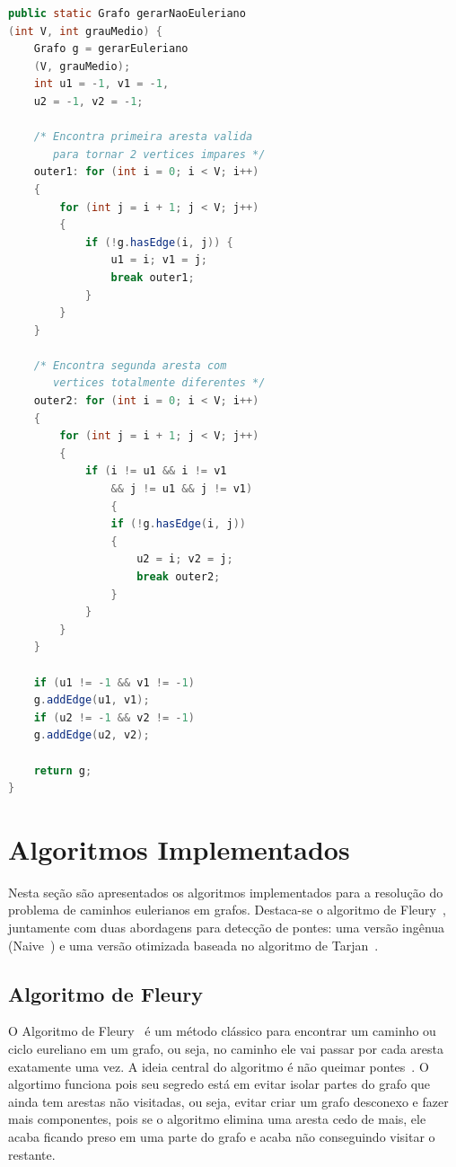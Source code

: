 \documentclass{sbc2023}%
\begin{document}
\begin{lstlisting}[language=Java, caption={Gerador de Grafo Não-Euleriano}]
public static Grafo gerarNaoEuleriano
(int V, int grauMedio) {
    Grafo g = gerarEuleriano
    (V, grauMedio);
    int u1 = -1, v1 = -1, 
    u2 = -1, v2 = -1;

    /* Encontra primeira aresta valida 
       para tornar 2 vertices impares */
    outer1: for (int i = 0; i < V; i++) 
    {
        for (int j = i + 1; j < V; j++) 
        {
            if (!g.hasEdge(i, j)) {
                u1 = i; v1 = j;
                break outer1;
            }
        }
    }

    /* Encontra segunda aresta com 
       vertices totalmente diferentes */
    outer2: for (int i = 0; i < V; i++) 
    {
        for (int j = i + 1; j < V; j++) 
        {
            if (i != u1 && i != v1 
                && j != u1 && j != v1) 
                {
                if (!g.hasEdge(i, j)) 
                {
                    u2 = i; v2 = j;
                    break outer2;
                }
            }
        }
    }

    if (u1 != -1 && v1 != -1) 
    g.addEdge(u1, v1);
    if (u2 != -1 && v2 != -1) 
    g.addEdge(u2, v2);

    return g;
}
\end{lstlisting}


\section{Algoritmos Implementados}

Nesta seção são apresentados os algoritmos implementados para a resolução do problema de caminhos eulerianos em grafos. Destaca-se o algoritmo de Fleury~\citep{AlgoFleury}, juntamente com duas abordagens para detecção de pontes: uma versão ingênua (Naive~\cite{cormen2022Naive}) e uma versão otimizada baseada no algoritmo de Tarjan~\cite{tarjan1972dfs}.

\subsection{Algoritmo de Fleury}
O Algoritmo de Fleury~\citep{AlgoFleury} é um método clássico para encontrar um caminho ou ciclo eureliano em um grafo, ou seja, no caminho ele vai passar por cada aresta exatamente uma vez. A ideia central do algoritmo é não queimar pontes~\citep{AlgoFleury}.
O algortimo funciona pois seu segredo está em evitar isolar partes do grafo que ainda tem arestas não visitadas, ou seja, evitar criar um grafo desconexo e fazer mais componentes, pois se o algoritmo elimina uma aresta cedo de mais, ele acaba ficando preso em uma parte do grafo e acaba não conseguindo visitar o restante.
\end{document}
